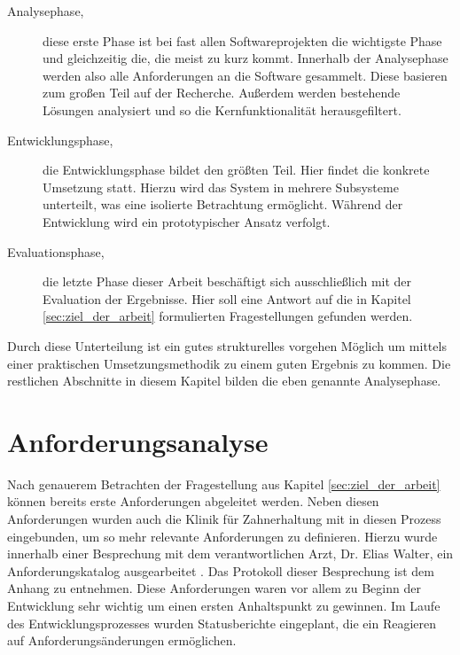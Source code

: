 \begin{description}
	\item[Analysephase,] diese erste Phase ist bei fast allen Softwareprojekten die
		wichtigste Phase und gleichzeitig die, die meist zu kurz kommt. Innerhalb der
		Analysephase werden also alle Anforderungen an die Software gesammelt. Diese
		basieren zum großen Teil auf der Recherche. Außerdem werden bestehende Lösungen
		analysiert und so die Kernfunktionalität herausgefiltert.

	\item[Entwicklungsphase,] die Entwicklungsphase bildet den größten Teil. Hier
		findet die konkrete Umsetzung statt. Hierzu wird das System in mehrere Subsysteme
		unterteilt, was eine isolierte Betrachtung ermöglicht. Während der Entwicklung
		wird ein prototypischer Ansatz verfolgt.

	\item[Evaluationsphase,] die letzte Phase dieser Arbeit beschäftigt sich ausschließlich
		mit der Evaluation der Ergebnisse. Hier soll eine Antwort auf die in Kapitel
		\ref{sec:ziel_der_arbeit} formulierten Fragestellungen gefunden werden.
\end{description}

Durch diese Unterteilung ist ein gutes strukturelles vorgehen Möglich um mittels
einer praktischen Umsetzungsmethodik zu einem guten Ergebnis zu kommen. Die
restlichen Abschnitte in diesem Kapitel bilden die eben genannte Analysephase.

\section{Anforderungsanalyse}
\label{sec:anforderungsanalyse} Nach genauerem Betrachten der Fragestellung aus
Kapitel \ref{sec:ziel_der_arbeit} können bereits erste Anforderungen abgeleitet
werden. Neben diesen Anforderungen wurden auch die Klinik für Zahnerhaltung mit in
diesen Prozess eingebunden, um so mehr relevante Anforderungen zu definieren. Hierzu
wurde innerhalb einer Besprechung mit dem verantwortlichen Arzt, Dr. Elias Walter,
ein Anforderungskatalog ausgearbeitet \citep[vgl.][]{walter2025}. Das Protokoll
dieser Besprechung ist dem Anhang zu entnehmen. Diese Anforderungen waren vor allem
zu Beginn der Entwicklung sehr wichtig um einen ersten Anhaltspunkt zu gewinnen.
Im Laufe des Entwicklungsprozesses wurden Statusberichte eingeplant, die ein Reagieren
auf Anforderungsänderungen ermöglichen.

